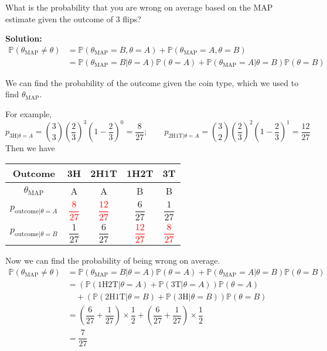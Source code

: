 \begin{eg}
  What is the probability that you are wrong on average based on the MAP estimate given the outcome of 3 flips? 

  \textbf{Solution:} 
  \[
    \begin{aligned}
      \mathbb{P}(\theta_{\text{MAP}} \neq \theta) &= \mathbb{P}(\theta_{\text{MAP}} = B, \theta = A) + \mathbb{P}(\theta_{\text{MAP}} = A, \theta = B) \\
      &= \mathbb{P}(\theta_{\text{MAP}} = B \vert \theta = A) \mathbb{P}(\theta = A) + \mathbb{P}(\theta_{\text{MAP}} = A \vert \theta = B) \mathbb{P}(\theta = B)
    \end{aligned}
  \]

  We can find the probability of the outcome given the coin type, which we used to find \(\theta_{\text{MAP}}\). 

  For example,
  \[
    p_{\text{3H} \vert \theta = A} = \binom{3}{3} (\frac{2}{3})^3 (1 - \frac{2}{3})^0 = \frac{8}{27}; \quad\quad p_{\text{2H1T} \vert \theta = A} = \binom{3}{2} (\frac{2}{3})^2 (1 - \frac{2}{3})^1 = \frac{12}{27}
  \]
  Then we have 
  \begin{table}[H]
    \centering
    \begin{tabular}{c|c|c|c|c}
        \toprule
        Outcome & 3H & 2H1T & 1H2T & 3T  \\
      \midrule
        \(\theta_{\text{MAP}}\) & A & A & B & B  \\[5pt]
        \(p_{\text{outcome} \vert \theta = A}\) & \textcolor{red}{\(\dfrac{8}{27}\)} & \textcolor{red}{\(\dfrac{12}{27}\)} & \(\dfrac{6}{27}\) & \(\dfrac{1}{27}\)  \\[8pt]
        \(p_{\text{outcome} \vert \theta = B}\) & \(\dfrac{1}{27}\) & \(\dfrac{6}{27}\) & \textcolor{red}{\(\dfrac{12}{27}\)} & \textcolor{red}{\(\dfrac{8}{27}\)}  \\
        \bottomrule
    \end{tabular}
  \end{table}
  Now we can find the probability of being wrong on average. 
  \[
    \begin{aligned}
      \mathbb{P}(\theta_{\text{MAP}} \neq \theta) &= \mathbb{P}(\theta_{\text{MAP}} = B \vert \theta = A) \mathbb{P}(\theta = A) + \mathbb{P}(\theta_{\text{MAP}} = A \vert \theta = B) \mathbb{P}(\theta = B) \\
      &= (\mathbb{P}(\text{1H2T} \vert \theta = A) + \mathbb{P}(\text{3T} \vert \theta = A)) \mathbb{P}(\theta = A) \\
      &\quad + (\mathbb{P}(\text{2H1T} \vert \theta = B) + \mathbb{P}(\text{3H} \vert \theta = B)) \mathbb{P}(\theta = B) \\ 
      &= \left(\dfrac{6}{27} + \dfrac{1}{27}\right) \times \dfrac{1}{2} + \left(\dfrac{6}{27} + \dfrac{1}{27}\right) \times \dfrac{1}{2} \\
      &= \dfrac{7}{27}
    \end{aligned}
  \]
\end{eg}


